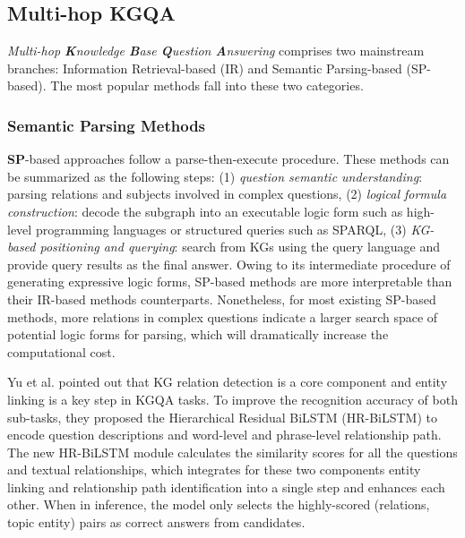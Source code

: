\documentclass[pdflatex,sn-mathphys]{sn-jnl}%
\theoremstyle{thmstyleone}%
\theoremstyle{thmstyletwo}%
\theoremstyle{thmstylethree}%
\begin{document}
\subsection{Multi-hop KGQA}
\textit{Multi-hop \textbf{K}nowledge \textbf{B}ase \textbf{Q}uestion \textbf{A}nswering} comprises two mainstream branches: Information Retrieval-based (IR) and Semantic Parsing-based (SP-based). The most popular methods fall into these two categories.

\subsubsection{Semantic Parsing Methods} \textbf{SP}-based approaches follow a parse-then-execute procedure. These methods \cite{yunshi2020graphKGQA,he2021stu-teaQA,huang2019KgeQA,apoorv2020embedKGQA,chen2021foodQA} can be summarized as the following steps: (1) \textit{question semantic understanding}: parsing relations and subjects involved in complex questions, (2) \textit{logical formula construction}: decode the subgraph into an executable logic form such as high-level programming languages or structured queries such as SPARQL, (3) \textit{KG-based positioning and querying}: search from KGs using the query language and provide query results as the final answer.
Owing to its intermediate procedure of generating expressive logic forms, SP-based methods are more interpretable than their IR-based methods counterparts. Nonetheless, for most existing SP-based methods, more relations in complex questions indicate a larger search space of potential logic forms for parsing, which will dramatically increase the computational cost. 

Yu et al. \cite{improvedRDKGQA} pointed out that KG relation detection is a core component and entity linking is a key step in KGQA tasks. To improve the recognition accuracy of both sub-tasks, they proposed the Hierarchical Residual BiLSTM (HR-BiLSTM) to encode question descriptions and word-level and phrase-level relationship path. The new HR-BiLSTM module calculates the similarity scores for all the questions and textual relationships, which integrates for these two components entity linking and relationship path identification into a single step and enhances each other. When in inference, the model only selects the highly-scored (relations, topic entity) pairs as correct answers from candidates.

\end{document}
